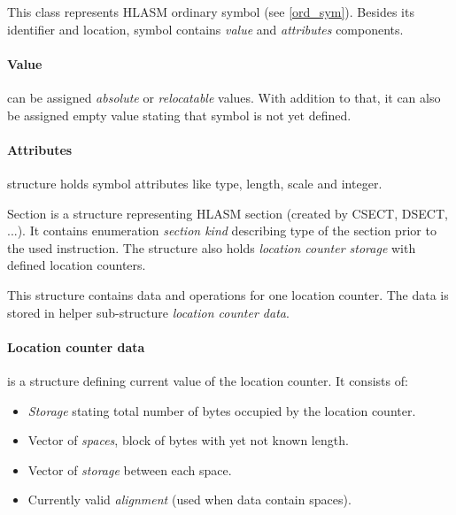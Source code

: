 This class represents HLASM ordinary symbol (see \cref{ord_sym}). Besides its identifier and location, symbol contains \emph{value} and \emph{attributes} components.

\paragraph*{Value} can be assigned \emph{absolute} or \emph{relocatable} values. With addition to that, it can also be assigned empty value stating that symbol is not yet defined.

\paragraph*{Attributes} structure holds symbol attributes like type, length, scale and integer.

Section is a structure representing HLASM section (created by CSECT, DSECT, ...). It contains enumeration \emph{section kind} describing type of the section prior to the used instruction. The structure also holds \emph{location counter storage} with defined location counters.

This structure contains data and operations for one location counter. The data is stored in helper sub-structure \emph{location counter data}.

\paragraph*{Location counter data} is a structure defining current value of the location counter. It consists of:
\begin{itemize}
	\item \emph{Storage} stating total number of bytes occupied by the location counter.
	\item Vector of \emph{spaces}, block of bytes with yet not known length.
	\item Vector of \emph{storage} between each space.
	\item Currently valid \emph{alignment} (used when data contain spaces).
\end{itemize}

